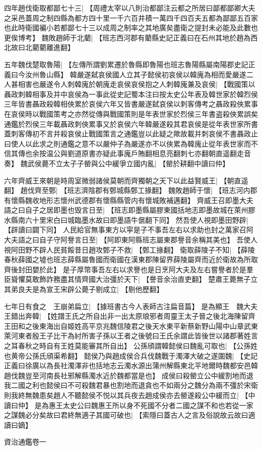 四年趙伐衛取都鄙七十三|{
	【周禮太宰以八則治都鄙注云都之所居曰鄙都鄙卿大夫之采邑蓋周之制四縣為都方四十里一千六百井積一萬四千四百夫五都為鄙鄙五百家也此時衛國褊小若都鄙七十三以成周之制率之其地廣矣盡衛之提封未必能及此數也更俟博考】}
魏敗趙師于北藺|{
	【班志西河郡有藺縣史記正義曰在石州其地於趙為西北故曰北藺藺離進翻】}
\par
五年魏伐楚取魯陽|{
	【左傳所謂劉累遷於魯縣即魯陽也班志魯陽縣屬南陽郡史記正義曰今汝州魯山縣】}
韓嚴遂弑哀侯國人立其子懿侯初哀侯以韓廆為相而愛嚴遂二人甚相害也嚴遂令人刺韓廆於朝廆走哀侯哀侯抱之人刺韓廆兼及哀侯|{
	【戰國策以聶政刺韓相事及并中哀侯為一事此從史記蜀本注曰按太史公年表及韓世家於韓烈侯三年皆書聶政殺韓相俠累於哀侯六年又皆書嚴遂弑哀侯以刺客傳考之聶政殺俠累事在哀侯時以戰國策考之亦然從傳與戰國策則是年表世家於烈侯三年書盗殺俠累誤矣通鑑於烈侯三年載聶政刺俠累事又於哀侯六年韓嚴遂殺其君哀侯是從年表世家所書蓋刺客傳初不言并殺哀侯止戰國策言之通鑑豈以此疑之歟故載并刺哀侯不書聶政止曰使人以此求之則通鑑之意不以嚴仲子為嚴遂亦不以俠累為韓廆止從年表世家而不信其傳也余按温公與劉道原書亦疑此事廆戶賄翻相息亮翻刺七亦翻朝直遥翻走音奏】}
魏武侯薨不立太子子罃與公中緩爭立國内亂|{
	【罃於耕翻中讀曰仲】}
\par
六年齊威王來朝是時周室微弱諸侯莫朝而齊獨朝之天下以此益賢威王|{
	【朝直遥翻】}
趙伐齊至鄄|{
	【班志濟陰郡有鄄城縣鄄工掾翻】}
魏敗趙師于懷|{
	【班志河内郡有懷縣魏收地形志懷州武德郡有懷縣縣管内有懷城敗補邁翻】}
齊威王召即墨大夫語之曰自子之居即墨也毁言日至|{
	【班志即墨縣屬膠東國括地志即墨故城在萊州膠水縣南六十里宋白曰城臨墨水故曰即墨語牛倨翻下同】}
然吾使人視即墨田野辟|{
	【辟讀曰闢下同】}
人民給官無事東方以寜是子不事吾左右以求助也封之萬家召阿大夫語之曰自子守阿譽言日至|{
	【阿即東阿縣班志屬東郡譽音余稱其美也】}
吾使人視阿田野不辟人民貧餒昔日趙攻鄄子不救|{
	【鄄工掾翻】}
衛取薛陵子不知|{
	【薛陵春秋薛國之墟也班志薛縣屬魯國而衛國在漢東郡陳留界薛陵屬齊而近於衛故為所取齊後封田嬰於此】}
是子厚幣事吾左右以求譽也是日烹阿大夫及左右嘗譽者於是羣臣聳懼莫敢飾詐務盡其情齊國大治彊於天下|{
	【譽音余治直吏翻】}
楚肅王薨無子立其弟良夫是為宣王宋辟公薨子剔成立|{
	【剔他歷翻】}
\par
七年日有食之　王崩弟扁立|{
	【據班書古今人表師古注扁音篇】}
是為顯王　魏大夫王錯出奔韓|{
	【姓譜王氏之所自出非一出太原琅邪者周靈王太子晉之後北海陳留齊王田和之後東海出自姬姓高平京兆魏信陵君之後天水東平新蔡新野山陽中山章武東萊河東者殷王子比干為紂所害子孫以王者之後號曰王氏余謂此皆後世以諸郡著姓言之耳春秋之時自有王姓莫能審其所自出】}
公孫頎謂韓懿侯曰魏亂可取也|{
	【公孫姓也黄帝公孫氏頎渠希翻】}
懿侯乃與趙成侯合兵伐魏戰于濁澤大破之遂圍魏|{
	【史記正義曰徐廣以為長社濁澤非也括地志云濁水源出蒲州解縣東北平地爾時魏都安邑韓趙伐魏豈至河南長社邪解縣濁水近於魏都當是也】}
成侯曰殺罃立公中緩割地而退我二國之利也懿侯曰不可殺魏君暴也割地而退貪也不如兩分之魏分為兩不彊於宋衛則我終無魏患矣趙人不聽懿侯不悦以其兵夜去趙成侯亦去罃遂殺公中緩而立|{
	【中讀曰仲】}
是為惠王太史公曰魏惠王所以身不死國不分者二國之謀不和也若從一家之謀魏必分矣故曰君終無適子其國可破也|{
	【索隱曰蓋古人之言及俗說故云故曰適讀曰嫡】}
\par
資治通鑑卷一

